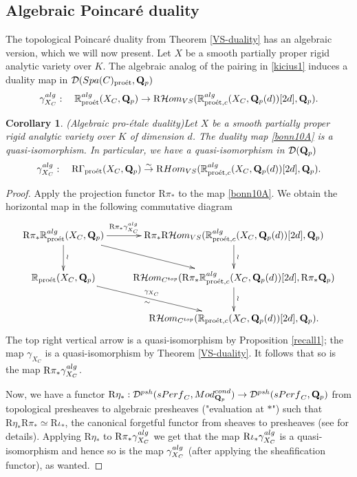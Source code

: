 \documentclass[10pt,reqno]{amsart}
\let\cal\mathcal
\newtheorem{corollary}[equation]{Corollary}
\theoremstyle{definition}
\theoremstyle{remark}
\newcommand{\proeet}{\operatorname{pro\acute{e}t} }
\newcommand{\Hom}{{\rm{Hom}} }
\newcommand{\Hhom}{{\cal Hom}}
\newcommand{\sd}{{\mathcal{D}}}
\numberwithin{equation}{section}
\def\R{{\mathrm R}}
\def\Q{{\bf Q}} \def\Z{{\bf Z}}
\def\rtau{${\rm R}\tau_*$, ${\rm R}\tau'_*$, ${\rm R}\eta_*$, ${\rm R}\pi_*$}
\numberwithin{equation}{section}
\begin{document}
\subsection{Algebraic Poincar\'e duality} The topological Poincar\'e duality from Theorem \ref{VS-duality} has an algebraic version, which we will now present. 
Let $X$ be a smooth partially proper  rigid analytic variety over $K$.
The algebraic analog of the pairing in \eqref{kicius1}  induces a duality map in 
 ${\sd}({\rm Spa}(C)_{\proeet},\Q_{p})$
\begin{equation}\label{bonn10A}
\gamma^{\rm alg}_{X_C}:\quad {\mathbb R}^{\rm alg}_{\proeet}(X_C,\Q_p)\to \R\Hhom_{\rm VS}({\mathbb R}^{\rm alg}_{\proeet,c}(X_C,\Q_p(d))[2d],{\Q}_p).
\end{equation}

  
\begin{corollary}{\rm (Algebraic pro-\'etale  duality)}\label{VSS-duality} Let $X$ be a smooth partially proper  rigid analytic variety over $K$ of dimension $d$.  The duality map
\eqref{bonn10A} is a quasi-isomorphism. In particular,
we have a quasi-isomorphism in $\sd(\Q_{p})$
\begin{equation}\label{deszcz111}
\gamma^{\rm alg}_{X_C}:\quad{\R}\Gamma_{\proeet}(X_C,\Q_p)\stackrel{\sim}{\to}\R\Hom_{\rm VS}({\mathbb R}^{\rm alg}_{\proeet,c}(X_C,\Q_p(d))[2d],\Q_p).
\end{equation}
\end{corollary}
\begin{proof} Apply the projection functor $\R\pi_*$ to the map \eqref{bonn10A}. We obtain the horizontal map in the following commutative diagram
$$
\xymatrix{
 \R\pi_*{\mathbb R}^{\rm alg}_{\proeet}(X_C,\Q_p)\ar[r]^-{\R\pi_*\gamma^{\rm alg}_{X_C}} \ar[rd] \ar[d]^{\wr}& \R\pi_*\R\Hhom_{\rm VS}({\mathbb R}^{\rm alg}_{\proeet,c}(X_C,\Q_p(d))[2d],{\Q}_p)\ar[d]^{\wr}\\
{\mathbb R}_{\proeet}(X_C,\Q_p)\ar[rd]^-{\gamma_{X_C}}_{\sim} & \R\Hhom_{C^{\rm top}}(\R\pi_*{\mathbb R}^{\rm alg}_{\proeet,c}(X_C,\Q_p(d))[2d],\R\pi_*{\Q}_p)\ar[d]^{\wr}\\
 & \R\Hhom_{C^{\rm top}}({\mathbb R}_{\proeet,c}(X_C,\Q_p(d))[2d],{\Q}_p).
}
$$
The top right vertical arrow is a quasi-isomorphism by Proposition \ref{recall1}; the map $\gamma_{X_C}$ is a quasi-isomorphism by Theorem \ref{VS-duality}. It follows that so is the map $\R\pi_*\gamma^{\rm alg}_{X_C}$. 

  Now, we have a \index{rtau@\rtau}functor $\R\eta_*: \sd^{\rm psh}({\rm sPerf}_C,{\rm Mod}^{\rm cond}_{\Q_p})\to  \sd^{\rm psh}({\rm sPerf}_C,\Q_p)$ from topological presheaves to algebraic presheaves ("evaluation at $*$") such that $\R\eta_*\R\pi_*\simeq \R\iota_*$, the canonical forgetful functor from sheaves to presheaves (see \cite[Sec. 2.1.2]{TVS} for details).
 Applying $\R\eta_*$ to $\R\pi_*\gamma^{\rm alg}_{X_C}$ we get that the map $\R\iota_*\gamma^{\rm alg}_{X_C}$ is a quasi-isomorphism and hence so is the map $\gamma^{\rm alg}_{X_C}$ (after applying the sheafification functor), as wanted. 
\end{proof}
\end{document}

